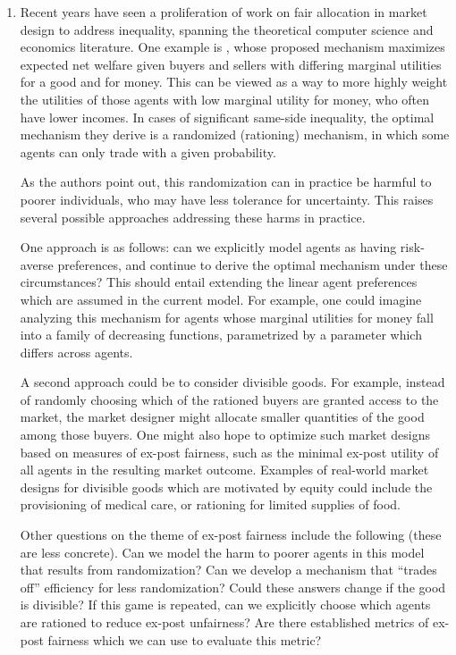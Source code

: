 \documentclass[AER]{AEA}
\begin{document}
\begin{enumerate}
    \item Recent years have seen a proliferation of work on fair allocation in market design to address inequality, spanning the theoretical computer science and economics literature. One example is \cite{akbarpour-2020}, whose proposed mechanism maximizes expected net welfare given buyers and sellers with differing marginal utilities for a good and for money. This can be viewed as a way to more highly weight the utilities of those agents with low marginal utility for money, who often have lower incomes. In cases of significant same-side inequality, the optimal mechanism they derive is a randomized (rationing) mechanism, in which some agents can only trade with a given probability.

    As the authors point out, this randomization can in practice be harmful to poorer individuals, who may have less tolerance for uncertainty. This raises several possible approaches addressing these harms in practice.
    
    One approach is as follows: can we explicitly model agents as having risk-averse preferences, and continue to derive the optimal mechanism under these circumstances? This should entail extending the linear agent preferences which are assumed in the current model. For example, one could imagine analyzing this mechanism for agents whose marginal utilities for money fall into a family of decreasing functions, parametrized by a parameter which differs across agents.
    
    A second approach could be to consider divisible goods. For example, instead of randomly choosing which of the rationed buyers are granted access to the market, the market designer might allocate smaller quantities of the good among those buyers. One might also hope to optimize such market designs based on measures of ex-post fairness, such as the minimal ex-post utility of all agents in the resulting market outcome. Examples of real-world market designs for divisible goods which are motivated by equity could include the provisioning of medical care, or rationing for limited supplies of food.

    Other questions on the theme of ex-post fairness include the following (these are less concrete). Can we model the harm to poorer agents in this model that results from randomization? Can we develop a mechanism that ``trades off'' efficiency for less randomization? Could these answers change if the good is divisible? If this game is repeated, can we explicitly choose which agents are rationed to reduce ex-post unfairness? Are there established metrics of ex-post fairness which we can use to evaluate this metric?


\end{enumerate}
\end{document}

